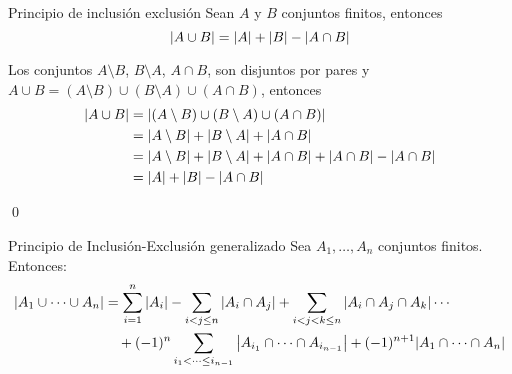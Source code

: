 	\begin{theorem}{Principio de inclusión exclusión}
		Sean $A$ y $B$ conjuntos finitos, entonces
		$$\abs{A\cup B}=\abs{A}+\abs{B}-\abs{A\cap B}$$
	\end{theorem}
	\begin{demostration}{}
		Los conjuntos $A\setminus B$, $B\setminus A$, $A\cap B$, son disjuntos por pares y $A\cup B=(A\setminus B)\cup(B\setminus A)\cup(A\cap B)$, entonces
		\begin{align*}
			\abs{A\cup B}&=\abs{(A\setminus B)\cup(B\setminus A)\cup(A\cap B)} \\
			&=\abs{A\setminus B}+\abs{B\setminus A}+\abs{A\cap B} \\
			&=\abs{A\setminus B}+\abs{B\setminus A}+\abs{A\cap B}+\abs{A\cap B}-\abs{A\cap B} \\
			&=\abs{A}+\abs{B}-\abs{A\cap B}
		\end{align*}
		\begin{flushright}
			\qed
		\end{flushright}
	\end{demostration}
	\begin{theorem}{Principio de Inclusión-Exclusión generalizado}
		Sea $A_1,\dotso,A_n$ conjuntos finitos. Entonces:
		\begin{align*}
			\abs{A_1\cup\dotsb\cup A_n}&= \sum_{i=1}^{n}{\abs{A_i}}-\sum_{i< j\leq n}{\abs{A_i\cap A_j}}+\sum_{i< j< k\leq n}{\abs{A_i\cap A_j\cap A_k}}\dotsb\\
			&\quad+(-1)^n\sum_{i_1< \dotsb\leq i_{n-1}}{\abs{A_{i_1}\cap\dotsb\cap A_{i_{n-1}}}}+(-1)^{n+1}\abs{A_1\cap\dotsb\cap A_n} \\
		\end{align*}
	\end{theorem}
